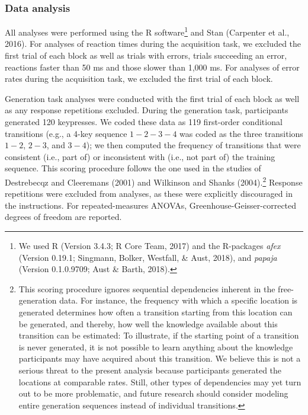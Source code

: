 \documentclass[man]{apa6}
\theoremstyle{definition}
\theoremstyle{definition}
\theoremstyle{definition}
\theoremstyle{remark}
\begin{document}
\subsubsection{Data analysis}\label{data-analysis}

All analyses were performed using the R software\footnote{We used R
  (Version 3.4.3; R Core Team, 2017) and the R-packages \emph{afex}
  (Version 0.19.1; Singmann, Bolker, Westfall, \& Aust, 2018), and
  \emph{papaja} (Version 0.1.0.9709; Aust \& Barth, 2018).} and Stan
(Carpenter et al., 2016). For analyses of reaction times during the
acquisition task, we excluded the first trial of each block as well as
trials with errors, trials succeeding an error, reactions faster than 50
ms and those slower than 1,000 ms. For analyses of error rates during
the acquisition task, we excluded the first trial of each block.

Generation task analyses were conducted with the first trial of each
block as well as any response repetitions excluded. During the
generation task, participants generated 120 keypresses. We coded these
data as 119 first-order conditional transitions (e.g., a 4-key sequence
\(1{-}2{-}3{-}4\) was coded as the three transitions \(1{-}2\),
\(2{-}3\), and \(3{-}4\)); we then computed the frequency of transitions
that were consistent (i.e., part of) or inconsistent with (i.e., not
part of) the training sequence. This scoring procedure follows the one
used in the studies of Destrebecqz and Cleeremans (2001) and Wilkinson
and Shanks (2004).\footnote{This scoring procedure ignores sequential
  dependencies inherent in the free-generation data. For instance, the
  frequency with which a specific location is generated determines how
  often a transition starting from this location can be generated, and
  thereby, how well the knowledge available about this transition can be
  estimated: To illustrate, if the starting point of a transition is
  never generated, it is not possible to learn anything about the
  knowledge participants may have acquired about this transition. We
  believe this is not a serious threat to the present analysis because
  participants generated the locations at comparable rates. Still, other
  types of dependencies may yet turn out to be more problematic, and
  future research should consider modeling entire generation sequences
  instead of individual transitions.} Response repetitions were excluded
from analyses, as these were explicitly discouraged in the instructions.
For repeated-measures ANOVAs, Greenhouse-Geisser-corrected degrees of
freedom are reported.
\end{document}
